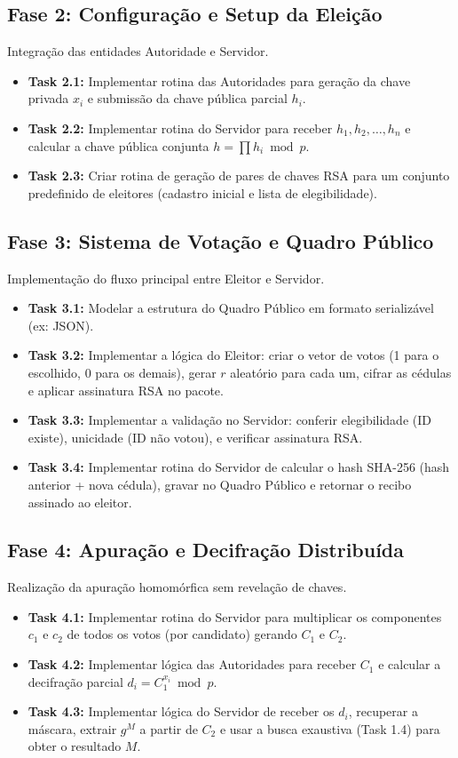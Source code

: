 \documentclass[12pt, a4paper]{article}
\begin{document}
\subsection{Fase 2: Configuração e Setup da Eleição}
Integração das entidades Autoridade e Servidor.
\begin{itemize}[label=$\square$]
    \item \textbf{Task 2.1:} Implementar rotina das Autoridades para geração da chave privada $x_i$ e submissão da chave pública parcial $h_i$.
    \item \textbf{Task 2.2:} Implementar rotina do Servidor para receber $h_1, h_2, \dots, h_n$ e calcular a chave pública conjunta $h = \prod h_i \bmod p$.
    \item \textbf{Task 2.3:} Criar rotina de geração de pares de chaves RSA para um conjunto predefinido de eleitores (cadastro inicial e lista de elegibilidade).
\end{itemize}

\subsection{Fase 3: Sistema de Votação e Quadro Público}
Implementação do fluxo principal entre Eleitor e Servidor.
\begin{itemize}[label=$\square$]
    \item \textbf{Task 3.1:} Modelar a estrutura do Quadro Público em formato serializável (ex: JSON).
    \item \textbf{Task 3.2:} Implementar a lógica do Eleitor: criar o vetor de votos (1 para o escolhido, 0 para os demais), gerar $r$ aleatório para cada um, cifrar as cédulas e aplicar assinatura RSA no pacote.
    \item \textbf{Task 3.3:} Implementar a validação no Servidor: conferir elegibilidade (ID existe), unicidade (ID não votou), e verificar assinatura RSA.
    \item \textbf{Task 3.4:} Implementar rotina do Servidor de calcular o hash SHA-256 (hash anterior + nova cédula), gravar no Quadro Público e retornar o recibo assinado ao eleitor.
\end{itemize}

\subsection{Fase 4: Apuração e Decifração Distribuída}
Realização da apuração homomórfica sem revelação de chaves.
\begin{itemize}[label=$\square$]
    \item \textbf{Task 4.1:} Implementar rotina do Servidor para multiplicar os componentes $c_1$ e $c_2$ de todos os votos (por candidato) gerando $C_1$ e $C_2$.
    \item \textbf{Task 4.2:} Implementar lógica das Autoridades para receber $C_1$ e calcular a decifração parcial $d_i = C_1^{x_i} \bmod p$.
    \item \textbf{Task 4.3:} Implementar lógica do Servidor de receber os $d_i$, recuperar a máscara, extrair $g^M$ a partir de $C_2$ e usar a busca exaustiva (Task 1.4) para obter o resultado $M$.
\end{itemize}
\end{document}
